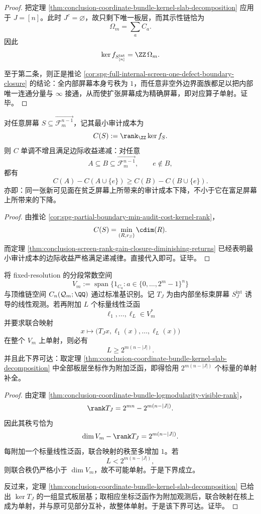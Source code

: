\begin{proof}
把定理 \ref{thm:conclusion-coordinate-bundle-kernel-slab-decomposition} 应用于 \(J=[n]\)。此时 \(J^c=\varnothing\)，故只剩下唯一板层，而其示性链恰为
\[
\Omega_m=\sum_{a} C_a.
\]
因此
\[
\ker f_{S_{[n]}^{\mathrm{int}}}=\ZZ\,\Omega_m.
\]

至于第二条，则正是推论 \ref{cor:spg-full-internal-screen-one-defect-boundary-closure} 的结论：全内部屏幕本身亏秩为 \(1\)，而任意非空外边界面族都足以把内部唯一连通分量与 \(\infty\) 接通，从而使扩张屏幕成为精确屏幕，即对应算子单射。证毕。
\end{proof}

\begin{corollary}[可见面的审计边际收益递减律]\label{cor:conclusion-screen-audit-marginal-diminishing-returns}
对任意屏幕 \(S\subseteq \overrightarrow{\mathcal F_m^{n-1}}\)，记其最小审计成本为
\[
C(S):=\rank_{\ZZ}\ker f_S.
\]
则 \(C\) 单调不增且满足边际收益递减：对任意
\[
A\subseteq B\subseteq \overrightarrow{\mathcal F_m^{n-1}},
\qquad
e\notin B,
\]
都有
\[
C(A)-C(A\cup\{e\})
\ge
C(B)-C(B\cup\{e\}).
\]
亦即：同一张新可见面在贫乏屏幕上所带来的审计成本下降，不小于它在富足屏幕上所带来的下降。
\end{corollary}

\begin{proof}
由推论 \ref{cor:spg-partial-boundary-min-audit-cost-kernel-rank}，
\[
C(S)=\min_{(R,r_S)}\cdim(R).
\]
而定理 \ref{thm:conclusion-screen-rank-gain-closure-diminishing-returns} 已经表明最小审计成本的边际收益严格满足递减律。直接代入即可。证毕。
\end{proof}

\begin{theorem}[相对线性全息的精确补充维数]\label{thm:conclusion-relative-linear-holography-exact-supplement-dimension}
将 fixed-resolution 的分段常数空间
\[
V_m:=\operatorname{span}\{1_{C_a}:a\in \{0,\dots,2^m-1\}^n\}
\]
与顶维链空间 \(C_n(\mathcal Q_m;\QQ)\) 通过标准基识别。记 \(T_J\) 为由内部坐标束屏幕 \(S_J^{\mathrm{int}}\) 诱导的线性观测。若再附加 \(L\) 个标量线性泛函
\[
\ell_1,\dots,\ell_L\in V_m^\ast
\]
并要求联合映射
\[
x\longmapsto \bigl(T_Jx,\ell_1(x),\dots,\ell_L(x)\bigr)
\]
在整个 \(V_m\) 上单射，则必有
\[
L\ge 2^{m(n-|J|)}.
\]
并且此下界可达：取定理 \ref{thm:conclusion-coordinate-bundle-kernel-slab-decomposition} 中全部板层坐标作为附加泛函，即得恰用 \(2^{m(n-|J|)}\) 个标量的单射补全。
\end{theorem}

\begin{proof}
由定理 \ref{thm:conclusion-coordinate-bundle-logmodularity-visible-rank}，
\[
\rank T_J=2^{mn}-2^{m(n-|J|)}.
\]
因此其秩亏恰为
\[
\dim V_m-\rank T_J=2^{m(n-|J|)}.
\]
每附加一个标量线性泛函，联合映射的秩至多增加 \(1\)。若
\[
L<2^{m(n-|J|)},
\]
则联合秩仍严格小于 \(\dim V_m\)，故不可能单射。于是下界成立。

反过来，定理 \ref{thm:conclusion-coordinate-bundle-kernel-slab-decomposition} 已给出 \(\ker T_J\) 的一组显式板层基；取相应坐标泛函作为附加观测后，联合映射在核上成为单射，并与原可见部分互补，故整体单射。于是该下界可达。证毕。
\end{proof}

